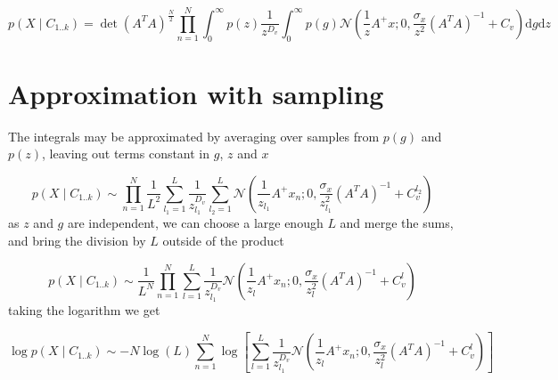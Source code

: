 \documentclass{paper}
\begin{document}
\begin{equation}
p(X \mid C_{1..k}) =  \det(A^T A)^{\frac{N}{2}} \prod_{n=1}^N \int_{0}^{\infty} p(z) \frac{1}{z^{D_v}}  \int_{0}^{\infty}  p(g) \mathcal{N}(\frac{1}{z} A^{+}x; 0,\frac{\sigma_x}{z^2} (A^T A)^{-1} + C_v) \mathrm{d}g \mathrm{d}z
\end{equation}

\section{Approximation with sampling}

The integrals may be approximated by averaging over samples from $p(g)$ and $p(z)$, leaving out terms constant in $g$, $z$ and $x$

\begin{equation}
p(X \mid C_{1..k}) \sim \prod_{n=1}^N  \frac{1}{L^2} \sum_{l_1=1}^L \frac{1}{z_{l_1}^{D_v}}  \sum_{l_2=1}^L \mathcal{N}(\frac{1}{z_{l_1}} A^{+}x_n; 0,\frac{\sigma_x}{z_{l_1}^2} (A^T A)^{-1} + C_v^{l_2})
\end{equation}
% 
as $z$ and $g$ are independent, we can choose a large enough $L$ and merge the sums, and bring the division by $L$ outside of the product

\begin{equation}
p(X \mid C_{1..k}) \sim \frac{1}{L^N} \prod_{n=1}^N  \sum_{l=1}^L \frac{1}{z_{l_1}^{D_v}}  \mathcal{N}(\frac{1}{z_l} A^{+}x_n; 0,\frac{\sigma_x}{z_l^2} (A^T A)^{-1} + C_v^l)
\end{equation}
%
taking the logarithm we get

\begin{equation}
\log p(X \mid C_{1..k}) \sim - N \log(L) \sum_{n=1}^N \log \left[ \sum_{l=1}^L \frac{1}{z_{l_1}^{D_v}}  \mathcal{N}(\frac{1}{z_l} A^{+}x_n; 0,\frac{\sigma_x}{z_l^2} (A^T A)^{-1} + C_v^l) \right]
\end{equation}
\end{document}
